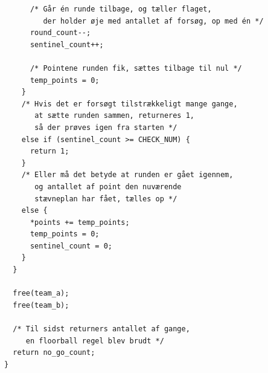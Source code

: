 \begin{source}
\begin{verbatim}
      /* Går én runde tilbage, og tæller flaget,
         der holder øje med antallet af forsøg, op med én */
      round_count--;
      sentinel_count++;

      /* Pointene runden fik, sættes tilbage til nul */
      temp_points = 0;
    }
    /* Hvis det er forsøgt tilstrækkeligt mange gange, 
       at sætte runden sammen, returneres 1, 
       så der prøves igen fra starten */
    else if (sentinel_count >= CHECK_NUM) {
      return 1;
    }
    /* Eller må det betyde at runden er gået igennem,
       og antallet af point den nuværende 
       stævneplan har fået, tælles op */
    else {
      *points += temp_points;
      temp_points = 0;
      sentinel_count = 0;
    }
  }

  free(team_a);
  free(team_b);

  /* Til sidst returners antallet af gange, 
     en floorball regel blev brudt */
  return no_go_count;
}
\end{verbatim}
\label{code:createTournament}
\end{source}

